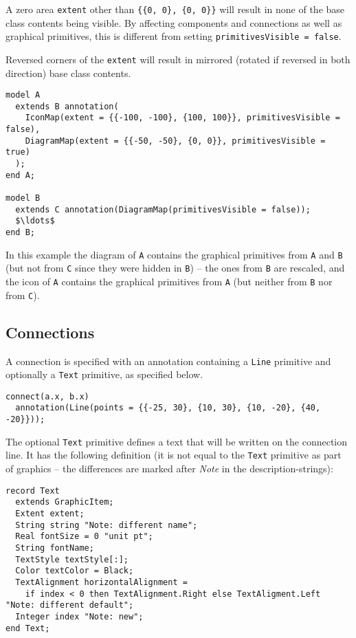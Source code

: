 \begin{nonnormative}
A zero area \lstinline!extent! other than \lstinline!{{0, 0}, {0, 0}}! will result in none of the base class contents being visible.
By affecting components and connections as well as graphical primitives, this is different from setting \lstinline!primitivesVisible = false!.

Reversed corners of the \lstinline!extent! will result in mirrored (rotated if reversed in both direction) base class contents.
\end{nonnormative}

\begin{example}
\begin{lstlisting}[language=modelica]
model A
  extends B annotation(
    IconMap(extent = {{-100, -100}, {100, 100}}, primitivesVisible = false),
    DiagramMap(extent = {{-50, -50}, {0, 0}}, primitivesVisible = true)
  );
end A;

model B
  extends C annotation(DiagramMap(primitivesVisible = false));
  $\ldots$
end B;
\end{lstlisting}
In this example the diagram of \lstinline!A! contains the graphical primitives from \lstinline!A! and \lstinline!B! (but not from \lstinline!C! since they were hidden in \lstinline!B!) -- the ones from \lstinline!B! are rescaled, and the icon of \lstinline!A! contains the graphical primitives from \lstinline!A! (but neither from \lstinline!B! nor from \lstinline!C!).
\end{example}

\subsection{Connections}\label{connections1}

A connection is specified with an annotation containing a \lstinline!Line! primitive and optionally a \lstinline!Text! primitive, as specified below.

\begin{example}
\begin{lstlisting}[language=modelica]
connect(a.x, b.x)
  annotation(Line(points = {{-25, 30}, {10, 30}, {10, -20}, {40, -20}}));
\end{lstlisting}
\end{example}

The optional \lstinline!Text! primitive defines a text that will be written on the connection line.
It has the following definition (it is not equal to the \lstinline!Text! primitive as part of graphics -- the differences are marked after \emph{Note} in the description-strings):
\begin{lstlisting}[language=modelica]
record Text
  extends GraphicItem;
  Extent extent;
  String string "Note: different name";
  Real fontSize = 0 "unit pt";
  String fontName;
  TextStyle textStyle[:];
  Color textColor = Black;
  TextAlignment horizontalAlignment =
    if index < 0 then TextAlignment.Right else TextAligment.Left "Note: different default";
  Integer index "Note: new";
end Text;
\end{lstlisting}

